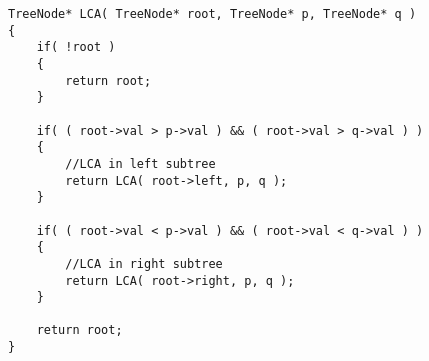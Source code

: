 \setcounter{lstlisting}{0}
\begin{lstlisting}[style=customc, caption={BST Properties}]
TreeNode* LCA( TreeNode* root, TreeNode* p, TreeNode* q )
{
    if( !root )
    {
        return root;
    }

    if( ( root->val > p->val ) && ( root->val > q->val ) )
    {
        //LCA in left subtree
        return LCA( root->left, p, q );
    }

    if( ( root->val < p->val ) && ( root->val < q->val ) )
    {
        //LCA in right subtree
        return LCA( root->right, p, q );
    }

    return root;
}

\end{lstlisting}